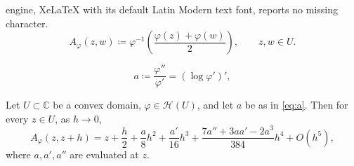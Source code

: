 \documentclass[10pt,a4paper]{amsart}
\begin{document}
engine, XeLaTeX with its default Latin Modern text font, reports no missing character.
\begin{equation}\label{eq:qam}
A_{\varphi}(z,w) \coloneqq  \varphi^{-1}\left(\frac{\varphi(z)+\varphi(w)}{2}\right), \qquad z, w \in U .
\end{equation}

\begin{equation}\label{eq:a}
a \coloneqq  \frac{\varphi''}{\varphi'} = (\log \varphi')' ,
\end{equation}

\begin{Lem}\label{lem:expansion}
Let $U \subset \mathbb{C}$ be a convex domain, $\varphi \in \mathcal{H}(U)$, and let $a$ be as in \eqref{eq:a}.
Then for every $z \in U$, as $h \to 0$,
\begin{equation}\label{eq:expansion}
A_{\varphi}(z, z+h) = z + \frac{h}{2} + \frac{a}{8} h^2 + \frac{a'}{16} h^3 + \frac{7a'' + 3aa' - 2a^3}{384} h^4 + O(h^5),
\end{equation}
where $a, a', a''$ are evaluated at $z$.
\end{Lem}
\end{document}
